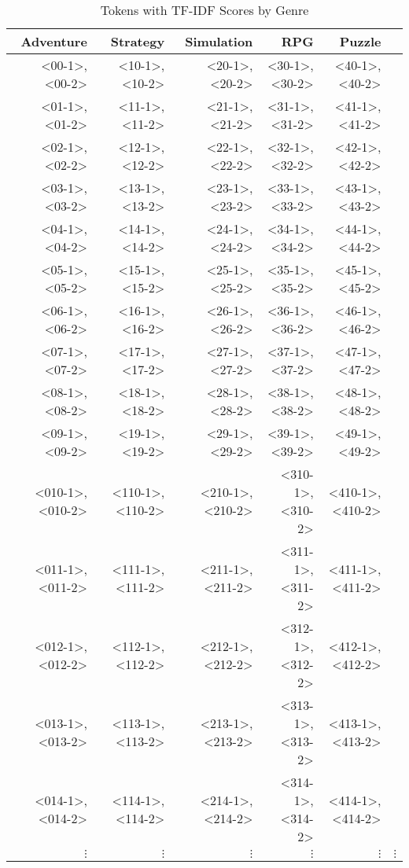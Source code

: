 \begin{table}[h]
    \centering
    \begin{tabular}{r|r|r|r|r|r}
        Adventure & Strategy & Simulation & RPG & Puzzle \\
        \hline
        <00-1>,  <00-2>  & <10-1>,  <10-2>  & <20-1>,  <20-2>  & <30-1>,  <30-2>  & <40-1>,  <40-2>  \\
        <01-1>,  <01-2>  & <11-1>,  <11-2>  & <21-1>,  <21-2>  & <31-1>,  <31-2>  & <41-1>,  <41-2>  \\
        <02-1>,  <02-2>  & <12-1>,  <12-2>  & <22-1>,  <22-2>  & <32-1>,  <32-2>  & <42-1>,  <42-2>  \\
        <03-1>,  <03-2>  & <13-1>,  <13-2>  & <23-1>,  <23-2>  & <33-1>,  <33-2>  & <43-1>,  <43-2>  \\
        <04-1>,  <04-2>  & <14-1>,  <14-2>  & <24-1>,  <24-2>  & <34-1>,  <34-2>  & <44-1>,  <44-2>  \\
        <05-1>,  <05-2>  & <15-1>,  <15-2>  & <25-1>,  <25-2>  & <35-1>,  <35-2>  & <45-1>,  <45-2>  \\
        <06-1>,  <06-2>  & <16-1>,  <16-2>  & <26-1>,  <26-2>  & <36-1>,  <36-2>  & <46-1>,  <46-2>  \\
        <07-1>,  <07-2>  & <17-1>,  <17-2>  & <27-1>,  <27-2>  & <37-1>,  <37-2>  & <47-1>,  <47-2>  \\
        <08-1>,  <08-2>  & <18-1>,  <18-2>  & <28-1>,  <28-2>  & <38-1>,  <38-2>  & <48-1>,  <48-2>  \\
        <09-1>,  <09-2>  & <19-1>,  <19-2>  & <29-1>,  <29-2>  & <39-1>,  <39-2>  & <49-1>,  <49-2>  \\
        <010-1>, <010-2> & <110-1>, <110-2> & <210-1>, <210-2> & <310-1>, <310-2> & <410-1>, <410-2> \\
        <011-1>, <011-2> & <111-1>, <111-2> & <211-1>, <211-2> & <311-1>, <311-2> & <411-1>, <411-2> \\
        <012-1>, <012-2> & <112-1>, <112-2> & <212-1>, <212-2> & <312-1>, <312-2> & <412-1>, <412-2> \\
        <013-1>, <013-2> & <113-1>, <113-2> & <213-1>, <213-2> & <313-1>, <313-2> & <413-1>, <413-2> \\
        <014-1>, <014-2> & <114-1>, <114-2> & <214-1>, <214-2> & <314-1>, <314-2> & <414-1>, <414-2> \\
        $\vdots$ & $\vdots$ & $\vdots$ & $\vdots$ & $\vdots$ & $\vdots$
    \end{tabular}
    \caption{Tokens with TF-IDF Scores by Genre}
    \label{tab:tfidf_by_genre}
\end{table}